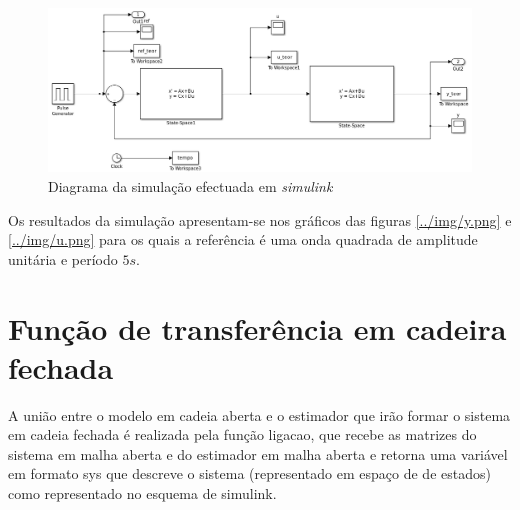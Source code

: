\documentclass[%
  reprint,
  nofootinbib,
  amsmath,amssymb,
  aps,
  10pt,
  a4paper
]{revtex4-1}
\begin{document}
\begin{figure}[t]
  \includegraphics[width=.6\textheight]{../img/simulink.png}%
  \caption{\label{../img/simulink.png} Diagrama da simulação efectuada em {\it simulink}}
\end{figure}


Os resultados da simulação apresentam-se nos gráficos das figuras \ref{../img/y.png} e \ref{../img/u.png} para os quais a referência é uma onda quadrada de amplitude unitária e período $5s$.

\section{Função de transferência em cadeira fechada}
\label{CF}	
A união entre o modelo em cadeia aberta e o estimador que irão formar o sistema em cadeia fechada é realizada pela função ligacao, que recebe as matrizes do sistema em malha aberta e do estimador em malha aberta e retorna uma variável em formato sys que descreve o sistema (representado em espaço de de estados) como representado no esquema de simulink.

\end{document}
